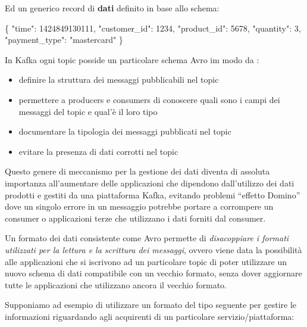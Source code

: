 \documentclass[]{article}
\newenvironment{Shaded}{}{}
\newcommand{\DataTypeTok}[1]{\textcolor[rgb]{0.56,0.13,0.00}{#1}}
\newcommand{\DecValTok}[1]{\textcolor[rgb]{0.25,0.63,0.44}{#1}}
\newcommand{\StringTok}[1]{\textcolor[rgb]{0.25,0.44,0.63}{#1}}
\newcommand{\FunctionTok}[1]{\textcolor[rgb]{0.02,0.16,0.49}{#1}}
\providecommand{\tightlist}{%
  \setlength{\itemsep}{0pt}\setlength{\parskip}{0pt}}
\begin{document}
\normalsize
\newpage
Ed un generico record di \textbf{dati} definito in base allo schema:

\small

\begin{Shaded}
\begin{Highlighting}[]
\FunctionTok{\{}  
  \DataTypeTok{"time"}\FunctionTok{:} \DecValTok{1424849130111}\FunctionTok{,}     
  \DataTypeTok{"customer_id"}\FunctionTok{:} \DecValTok{1234}\FunctionTok{,}  
  \DataTypeTok{"product_id"}\FunctionTok{:} \DecValTok{5678}\FunctionTok{,}  
  \DataTypeTok{"quantity"}\FunctionTok{:} \DecValTok{3}\FunctionTok{,}  
  \DataTypeTok{"payment_type"}\FunctionTok{:} \StringTok{"mastercard"}  
\FunctionTok{\}}
\end{Highlighting}
\end{Shaded}

\normalsize

In Kafka ogni topic posside un particolare schema Avro im modo da :

\begin{itemize}
\tightlist
\item
  definire la struttura dei messaggi pubblicabili nel topic
\item
  permettere a producers e consumers di conoscere quali sono i campi dei
  messaggi del topic e qual'è il loro tipo
\item
  documentare la tipologia dei messaggi pubblicati nel topic
\item
  evitare la presenza di dati corrotti nel topic
\end{itemize}

Questo genere di meccanismo per la gestione dei dati diventa di assoluta
importanza all'aumentare delle applicazioni che dipendono dall'utilizzo
dei dati prodotti e gestiti da una piattaforma Kafka, evitando problemi
``effetto Domino'' dove un singolo errore in un messaggio potrebbe
portare a corrompere un consumer o applicazioni terze che utilizzano i
dati forniti dal consumer.

Un formato dei dati consistente come Avro permette di \emph{disacoppiare
i formati utilizzati per la lettura e la scrittura dei messaggi}, ovvero
viene data la possibilità alle applicazioni che si iscrivono ad un
particolare topic di poter utilizzare un nuovo schema di dati
compatibile con un vecchio formato, senza dover aggiornare tutte le
applicazioni che utilizzano ancora il vecchio formato.

Supponiamo ad esempio di utilizzare un formato del tipo seguente per
gestire le informazioni riguardando agli acquirenti di un particolare
servizio/piattaforma:
\end{document}
